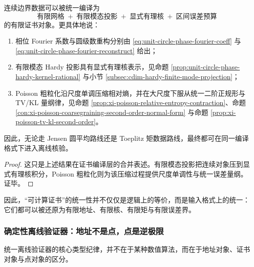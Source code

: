 \begin{proposition}[统一可计算证书模板]\label{prop:typed-address-biaxial-completion-computable-certificate-template}
连续边界数据可以被统一编译为
\[
\text{有限网格}
\;+\;
\text{有限模态投影}
\;+\;
\text{显式有理核}
\;+\;
\text{区间误差预算}
\]
的有限证书对象。更具体地说：
\begin{enumerate}
  \item 相位 Fourier 系数与圆级数重构分别由 \eqref{eq:unit-circle-phase-fourier-coeff} 与 \eqref{eq:unit-circle-phase-fourier-reconstruct} 给出；
  \item 有限模态 Hardy 投影具有显式有理核表示，见命题 \ref{prop:unit-circle-phase-hardy-kernel-rational} 与小节 \ref{subsec:cdim-hardy-finite-mode-projection}；
  \item Poisson 粗粒化沿尺度单调压缩相对熵，并在大尺度下服从统一二阶正规形与 TV/KL 量纲律，见命题 \ref{prop:xi-poisson-relative-entropy-contraction}、命题 \ref{con:xi-poisson-coarsegraining-second-order-normal-form} 与命题 \ref{prop:xi-poisson-tv-kl-second-order}。
\end{enumerate}
因此，无论走 Jensen 圆平均路线还是 Toeplitz 矩数据路线，最终都可在同一编译格式下进入离线核验。
\end{proposition}
\begin{proof}
这只是上述结果在证书编译层的合并表述。有限模态投影把连续对象压到显式有理核积分，Poisson 粗粒化则为该压缩过程提供尺度单调性与统一误差量纲。证毕。
\end{proof}

因此，“可计算证书”的统一性并不仅仅是逻辑上的等价，而是输入格式上的统一：它们都可以被还原为有限地址、有限核、有限矩与有限误差界。

\subsubsection{确定性离线验证器：地址不是点，点是逆极限}\label{subsubsec:typed-address-biaxial-completion-unified-offline-verifier}
统一离线验证器的核心类型纪律，并不在于某种数值算法，而在于地址对象、证书对象与点对象的区分。

